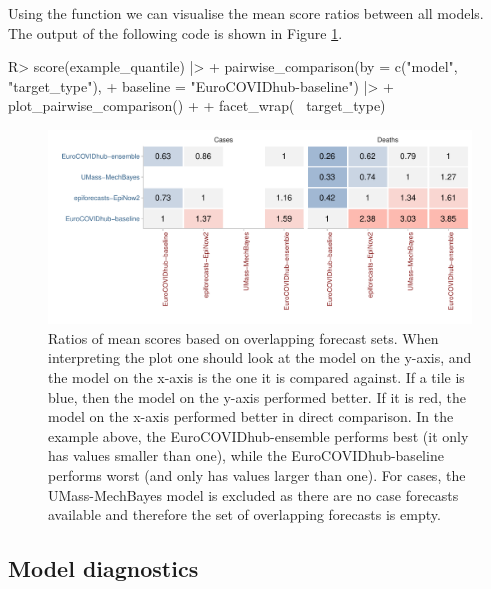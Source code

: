 \documentclass[
]{jss}
\begin{document}
Using the function  we can visualise
the mean score ratios between all models. The output of the following
code is shown in Figure \ref{fig:pairwise-plot}.

\begin{CodeChunk}
\begin{CodeInput}
R> score(example_quantile) |>
+   pairwise_comparison(by = c("model", "target_type"),
+                       baseline = "EuroCOVIDhub-baseline") |>
+   plot_pairwise_comparison() +
+   facet_wrap(~ target_type)
\end{CodeInput}
\begin{figure}

{\centering \includegraphics[width=1\linewidth]{manuscript_files/figure-latex/pairwise-plot-1}

}

\caption[Ratios of mean scores based on overlapping forecast sets]{Ratios of mean scores based on overlapping forecast sets. When interpreting the plot one should look at the model on the y-axis, and the model on the x-axis is the one it is compared against. If a tile is blue, then the model on the y-axis performed better. If it is red, the model on the x-axis performed better in direct comparison. In the example above, the EuroCOVIDhub-ensemble performs best (it only has values smaller than one), while the EuroCOVIDhub-baseline performs worst (and only has values larger than one). For cases, the UMass-MechBayes model is excluded as there are no case forecasts available and therefore the set of overlapping forecasts is empty.}\label{fig:pairwise-plot}
\end{figure}
\end{CodeChunk}

\hypertarget{model-diagnostics}{%
\subsection{Model diagnostics}\label{model-diagnostics}}
\end{document}
